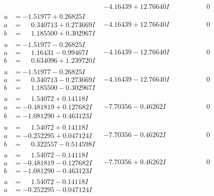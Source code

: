 \documentclass[1p]{elsarticle_modified}
\theoremstyle{definition}
\begin{document}
$$\begin{array}{c|c|c}
 & -4.16439 + 12.76640 I & \phantom{-0.000000 } 0 \\ \hline\begin{aligned}
u &= -1.51977 + 0.26825 I \\
a &= \phantom{-}0.340713 + 0.273669 I \\
b &= \phantom{-}1.185500 + 0.302967 I\end{aligned}
 & -4.16439 + 12.76640 I & \phantom{-0.000000 } 0 \\ \hline\begin{aligned}
u &= -1.51977 - 0.26825 I \\
a &= \phantom{-}1.16431 - 0.99467 I \\
b &= \phantom{-}0.634096 + 1.239720 I\end{aligned}
 & -4.16439 - 12.76640 I & \phantom{-0.000000 } 0 \\ \hline\begin{aligned}
u &= -1.51977 - 0.26825 I \\
a &= \phantom{-}0.340713 - 0.273669 I \\
b &= \phantom{-}1.185500 - 0.302967 I\end{aligned}
 & -4.16439 - 12.76640 I & \phantom{-0.000000 } 0 \\ \hline\begin{aligned}
u &= \phantom{-}1.54072 + 0.14118 I \\
a &= -0.481819 + 0.127682 I \\
b &= -1.081290 + 0.463123 I\end{aligned}
 & -7.70356 - 0.46262 I & \phantom{-0.000000 } 0 \\ \hline\begin{aligned}
u &= \phantom{-}1.54072 + 0.14118 I \\
a &= -0.252295 + 0.047124 I \\
b &= \phantom{-}0.322557 - 0.514598 I\end{aligned}
 & -7.70356 - 0.46262 I & \phantom{-0.000000 } 0 \\ \hline\begin{aligned}
u &= \phantom{-}1.54072 - 0.14118 I \\
a &= -0.481819 - 0.127682 I \\
b &= -1.081290 - 0.463123 I\end{aligned}
 & -7.70356 + 0.46262 I & \phantom{-0.000000 } 0 \\ \hline\begin{aligned}
u &= \phantom{-}1.54072 - 0.14118 I \\
a &= -0.252295 - 0.047124 I \\

\end{aligned}
\end{array}$$
\end{document}
